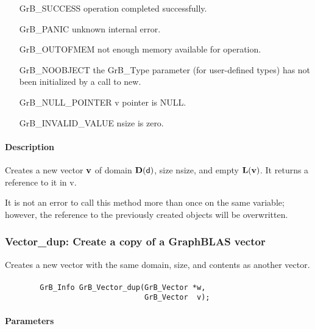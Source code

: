 \begin{itemize}[leftmargin=2.1in]
\item[{\sf GrB\_SUCCESS}]    operation completed successfully.
\item[{\sf GrB\_PANIC}]      unknown internal error.
\item[{\sf GrB\_OUTOFMEM}]   not enough memory available for operation.
\item[{\sf GrB\_NOOBJECT}]   the {\sf GrB\_Type} parameter (for user-defined
                             types) has not been initialized by a
                             call to {\sf new}.
\item[{\sf GrB\_NULL\_POINTER}]    {\sf v} pointer is {\sf NULL}.
\item[{\sf GrB\_INVALID\_VALUE}]    {\sf nsize} is zero.
\end{itemize}

\paragraph{Description}

Creates a new vector ${\bf v}$ of domain $\bold{D}({\sf d})$, size {\sf nsize}, 
and empty $\bold{L}({\bf v})$. It returns a reference to it in {\sf v}.

It is not an error to call this method more than once on the same variable;  
however, the reference to the previously created objects will be overwritten. 

\subsubsection{{\sf Vector\_dup}: Create a copy of a GraphBLAS vector}

Creates a new vector with the same domain, size, and contents as another vector.

\paragraph{\syntax}

\begin{verbatim}
        GrB_Info GrB_Vector_dup(GrB_Vector *w,
                                GrB_Vector  v);
\end{verbatim}

\paragraph{Parameters}

